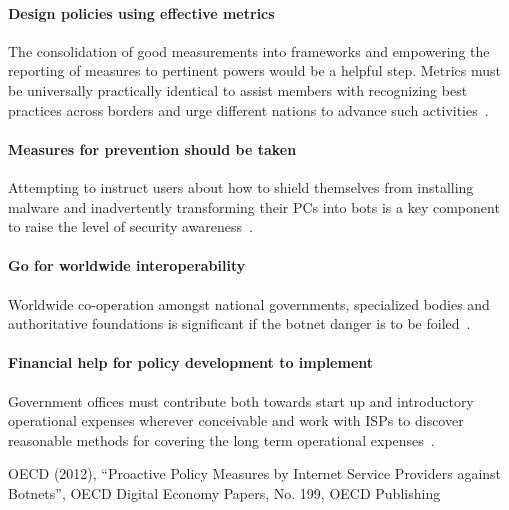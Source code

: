 \paragraph{Design policies using effective metrics}
The consolidation of good measurements into frameworks and empowering the reporting of measures to pertinent powers would be a helpful step. Metrics must be universally practically identical to assist members with recognizing best practices across borders and urge different nations to advance such activities~\cite{OECD}.

\paragraph{Measures for prevention should be taken}
Attempting to instruct users about how to shield themselves from installing malware and inadvertently transforming their PCs into bots is a key component to raise the level of security awareness~\cite{OECD}.

\paragraph{Go for worldwide interoperability}
Worldwide co-operation amongst national governments, specialized bodies and authoritative foundations is significant if the botnet danger is to be foiled~\cite{OECD}.

\paragraph{Financial help for policy development to implement}
Government offices must contribute both towards start up and introductory operational expenses wherever conceivable and work with ISPs to discover reasonable methods for covering the long term operational expenses~\cite{OECD}.


%
OECD (2012), “Proactive Policy Measures by Internet Service Providers against Botnets”, OECD Digital Economy Papers, No. 199, OECD Publishing
